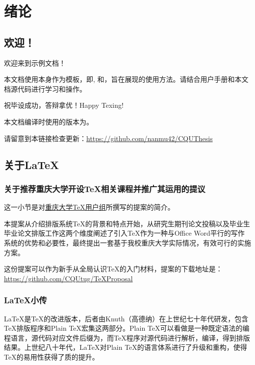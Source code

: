 \chapter{绪论}
\section{欢迎！}
欢迎来到\PRCthesis{}示例文档！

本文档使用\PRCthesis{}本身作为模板，即, 和，旨在展现\PRCthesis{}的使用方法。请结合\PRCthesis{}用户手册和本文档源代码进行学习和操作。

祝毕设成功，答辩拿优！Happy Texing!

本文档编译时使用的\PRCthesis{}版本为\version{}。

请留意到本链接检查更新：\url{https://github.com/nanmu42/CQUThesis}

\section{关于\LaTeX{}}

\subsection{关于推荐重庆大学开设\TeX 相关课程并推广其运用的提议}
这一小节是对\href{http://jq.qq.com/?_wv=1027&k=2HvYu95}{重庆大学\TeX 用户组}所撰写的提案的简介。

本提案从介绍排版系统\TeX 的背景和特点开始，从研究生期刊论文投稿以及毕业生毕业论文排版工作这两个维度阐述了引入\TeX 作为一种与Office Word平行的写作系统的优势和必要性，最终提出一套基于我校重庆大学实际情况，有效可行的实施方案。

这份提案可以作为新手从全局认识\TeX 的入门材料，提案的下载地址是：\url{https://github.com/CQUtug/TeXProposal}

\subsection{\LaTeX{}小传}
\LaTeX{}是\TeX{}的改进版本，后者由Knuth（高德纳）在上世纪七十年代研发，包含\TeX{}排版程序和Plain \TeX{}宏集这两部分。Plain \TeX{}可以看做是一种既定语法的编程语言，源代码对应文件后缀为，而\TeX{}程序对源代码进行解析，编译，得到排版结果。上世纪八十年代，\LaTeX{}对Plain \TeX{}的语言体系进行了升级和重构，使得\TeX{}的易用性获得了质的提升。

